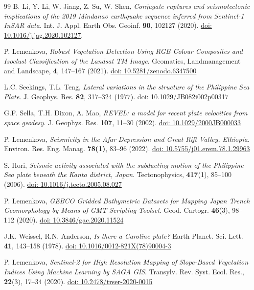 \documentclass{rrparticle}
\begin{document}
\begin{thebibliography}{99}
 B. Li, Y. Li, W. Jiang, Z. Su, W. Shen, \emph{Conjugate ruptures and seismotectonic implications of the 2019 Mindanao earthquake sequence inferred from Sentinel-1 InSAR data}. Int. J. Appl. Earth Obs. Geoinf. \textbf{90}, 102127 (2020). \href{https://doi.org/10.1016/j.jag.2020.102127}{doi: 10.1016/j.jag.2020.102127}.

P. Lemenkova, \emph{Robust Vegetation Detection Using RGB Colour Composites and Isoclust Classification of the Landsat TM Image}. Geomatics, Landmanagement and Landscape, \textbf{4}, 147--167 (2021). \href{https://doi.org/10.5281/zenodo.6347500}{doi: 10.5281/zenodo.6347500}

 L.C. Seekings, T.L. Teng, \emph{Lateral variations in the structure of the Philippine Sea Plate}. J. Geophys. Res. \textbf{82}, 317--324 (1977). \href{https://doi.org/10.1029/JB082i002p00317}{doi: 10.1029/JB082i002p00317}

 G.F. Sella, T.H. Dixon, A. Mao, \emph{REVEL: a model for recent plate velocities from space geodesy}. J. Geophys. Res. \textbf{107}, 11--30 (2002). \href{https://doi.org/10.1029/2000JB000033}{doi: 10.1029/2000JB000033}

 P. Lemenkova, \emph{Seismicity in the Afar Depression and Great Rift Valley, Ethiopia}. Environ. Res. Eng. Manag.  \textbf{78(1)}, 83--96 (2022). \href{https://doi.org/10.5755/j01.erem.78.1.29963}{doi: 10.5755/j01.erem.78.1.29963}

 S. Hori, \emph{Seismic activity associated with the subducting motion of the Philippine Sea plate beneath the Kanto district, Japan}. Tectonophysics, \textbf{417}(1), 85--100 (2006). \href{https://doi.org/10.1016/j.tecto.2005.08.027}{doi: 10.1016/j.tecto.2005.08.027}

 P. Lemenkova, \emph{GEBCO Gridded Bathymetric Datasets for Mapping Japan Trench Geomorphology by Means of GMT Scripting Toolset}. Geod. Cartogr. \textbf{46}(3), 98--112 (2020). \href{https://doi.org/10.3846/gac.2020.11524}{doi: 10.3846/gac.2020.11524}

 J.K. Weissel, R.N. Anderson, \emph{Is there a Caroline plate?} Earth Planet. Sci. Lett. \textbf{41}, 143--158 (1978). \href{https://doi.org/10.1016/0012-821X(78)90004-3}{doi: 10.1016/0012-821X(78)90004-3}

P. Lemenkova, \emph{Sentinel-2 for High Resolution Mapping of Slope-Based Vegetation Indices Using Machine Learning by SAGA GIS}. Transylv. Rev. Syst. Ecol. Res., \textbf{22}(3), 17--34 (2020). \href{https://doi.org/10.2478/trser-2020-0015}{doi: 10.2478/trser-2020-0015}


\end{thebibliography}
\end{document}
